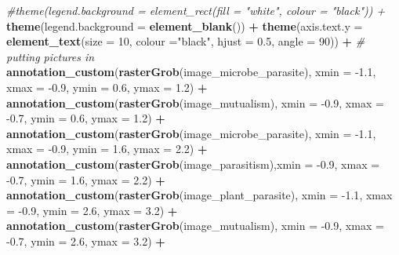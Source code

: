 \documentclass[
]{article}
\newenvironment{Shaded}{\begin{snugshade}}{\end{snugshade}}
\newcommand{\CommentTok}[1]{\textcolor[rgb]{0.56,0.35,0.01}{\textit{#1}}}
\newcommand{\DataTypeTok}[1]{\textcolor[rgb]{0.13,0.29,0.53}{#1}}
\newcommand{\DecValTok}[1]{\textcolor[rgb]{0.00,0.00,0.81}{#1}}
\newcommand{\FloatTok}[1]{\textcolor[rgb]{0.00,0.00,0.81}{#1}}
\newcommand{\KeywordTok}[1]{\textcolor[rgb]{0.13,0.29,0.53}{\textbf{#1}}}
\newcommand{\NormalTok}[1]{#1}
\newcommand{\OperatorTok}[1]{\textcolor[rgb]{0.81,0.36,0.00}{\textbf{#1}}}
\newcommand{\StringTok}[1]{\textcolor[rgb]{0.31,0.60,0.02}{#1}}
\begin{document}
\begin{Shaded}
\begin{Highlighting}[]
{{{{{\StringTok{  }\CommentTok{#theme(legend.background = element_rect(fill = "white", colour = "black")) +}
\StringTok{  }\KeywordTok{theme}\NormalTok{(}\DataTypeTok{legend.background =} \KeywordTok{element_blank}\NormalTok{()) }\OperatorTok{+}
\StringTok{  }\KeywordTok{theme}\NormalTok{(}\DataTypeTok{axis.text.y =} \KeywordTok{element_text}\NormalTok{(}\DataTypeTok{size =} \DecValTok{10}\NormalTok{, }\DataTypeTok{colour =}\StringTok{"black"}\NormalTok{, }\DataTypeTok{hjust =} \FloatTok{0.5}\NormalTok{, }\DataTypeTok{angle =} \DecValTok{90}\NormalTok{)) }\OperatorTok{+}
\StringTok{    }\CommentTok{# putting pictures in}
\StringTok{  }\KeywordTok{annotation_custom}\NormalTok{(}\KeywordTok{rasterGrob}\NormalTok{(image_microbe_parasite), }\DataTypeTok{xmin =} \FloatTok{-1.1}\NormalTok{, }\DataTypeTok{xmax =} \FloatTok{-0.9}\NormalTok{, }\DataTypeTok{ymin =} \FloatTok{0.6}\NormalTok{, }\DataTypeTok{ymax =} \FloatTok{1.2}\NormalTok{) }\OperatorTok{+}\StringTok{ }
\StringTok{  }\KeywordTok{annotation_custom}\NormalTok{(}\KeywordTok{rasterGrob}\NormalTok{(image_mutualism), }\DataTypeTok{xmin =} \FloatTok{-0.9}\NormalTok{, }\DataTypeTok{xmax =} \FloatTok{-0.7}\NormalTok{, }\DataTypeTok{ymin =} \FloatTok{0.6}\NormalTok{, }\DataTypeTok{ymax =} \FloatTok{1.2}\NormalTok{) }\OperatorTok{+}\StringTok{ }
\StringTok{  }\KeywordTok{annotation_custom}\NormalTok{(}\KeywordTok{rasterGrob}\NormalTok{(image_microbe_parasite), }\DataTypeTok{xmin =} \FloatTok{-1.1}\NormalTok{, }\DataTypeTok{xmax =} \FloatTok{-0.9}\NormalTok{, }\DataTypeTok{ymin =} \FloatTok{1.6}\NormalTok{, }\DataTypeTok{ymax =} \FloatTok{2.2}\NormalTok{) }\OperatorTok{+}
\StringTok{  }\KeywordTok{annotation_custom}\NormalTok{(}\KeywordTok{rasterGrob}\NormalTok{(image_parasitism),}\DataTypeTok{xmin =} \FloatTok{-0.9}\NormalTok{, }\DataTypeTok{xmax =} \FloatTok{-0.7}\NormalTok{, }\DataTypeTok{ymin =} \FloatTok{1.6}\NormalTok{, }\DataTypeTok{ymax =} \FloatTok{2.2}\NormalTok{) }\OperatorTok{+}
\StringTok{  }\KeywordTok{annotation_custom}\NormalTok{(}\KeywordTok{rasterGrob}\NormalTok{(image_plant_parasite), }\DataTypeTok{xmin =} \FloatTok{-1.1}\NormalTok{, }\DataTypeTok{xmax =} \FloatTok{-0.9}\NormalTok{, }\DataTypeTok{ymin =} \FloatTok{2.6}\NormalTok{, }\DataTypeTok{ymax =} \FloatTok{3.2}\NormalTok{) }\OperatorTok{+}\StringTok{ }
\StringTok{  }\KeywordTok{annotation_custom}\NormalTok{(}\KeywordTok{rasterGrob}\NormalTok{(image_mutualism), }\DataTypeTok{xmin =} \FloatTok{-0.9}\NormalTok{, }\DataTypeTok{xmax =} \FloatTok{-0.7}\NormalTok{, }\DataTypeTok{ymin =} \FloatTok{2.6}\NormalTok{, }\DataTypeTok{ymax =} \FloatTok{3.2}\NormalTok{) }\OperatorTok{+}\StringTok{ }
}}}}}
\end{Highlighting}
\end{Shaded}
\end{document}
